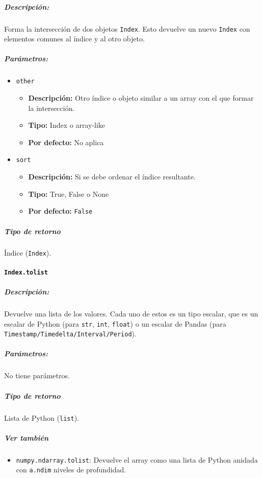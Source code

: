 \subparagraph{Descripción:}
Forma la intersección de dos objetos \texttt{Index}. Esto devuelve un nuevo
\texttt{Index} con elementos comunes al índice y al otro objeto.

\subparagraph{Parámetros:}

\begin{itemize}
    \item \texttt{other}
          \begin{itemize}
              \item \textbf{Descripción:} Otro índice o objeto similar a un
                    array con el que formar la intersección.
              \item \textbf{Tipo:} Index o array-like
              \item \textbf{Por defecto:} No aplica
          \end{itemize}
    \item \texttt{sort}
          \begin{itemize}
              \item \textbf{Descripción:} Si se debe ordenar el índice
                    resultante.
              \item \textbf{Tipo:} True, False o None
              \item \textbf{Por defecto:} \texttt{False}
          \end{itemize}
\end{itemize}

\subparagraph{Tipo de retorno}
Índice (\texttt{Index}).

\paragraph{\texttt{Index.tolist}}

\subparagraph{Descripción:}
Devuelve una lista de los valores. Cada uno de estos es un tipo escalar, que es
un escalar de Python (para \texttt{str}, \texttt{int}, \texttt{float}) o un
escalar de Pandas (para \texttt{Timestamp/Timedelta/Interval/Period}).

\subparagraph{Parámetros:}
No tiene parámetros.

\subparagraph{Tipo de retorno}
Lista de Python (\texttt{list}).

\subparagraph{Ver también}
\begin{itemize}
    \item \texttt{numpy.ndarray.tolist}: Devuelve el array como una lista de
          Python anidada con \texttt{a.ndim} niveles de profundidad.
\end{itemize}


